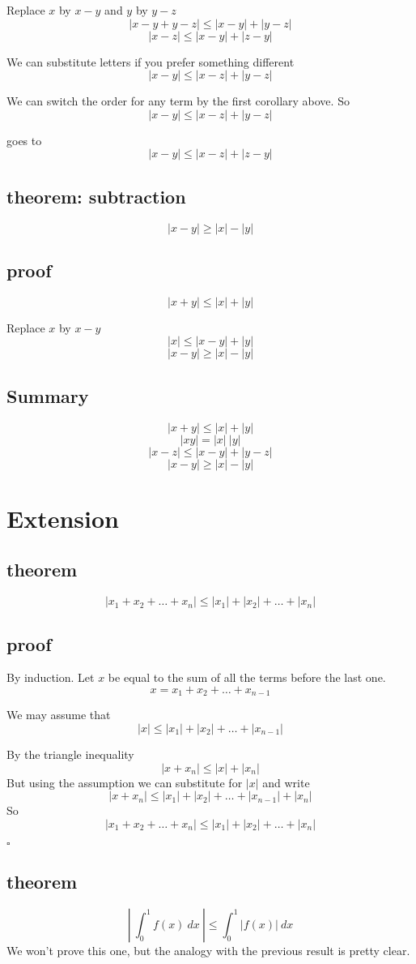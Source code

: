 \documentclass[11pt, oneside]{article}
\begin{document}
Replace $x$ by $x-y$ and $y$ by $y-z$ 
\[ |x-y + y-z| \le |x-y| + |y-z| \]
\[ |x - z|  \le |x - y| + |z - y| \]

We can substitute letters if you prefer something different
\[ |x - y|  \le |x - z| + |y - z| \]

We can switch the order for any term by the first corollary above.  So
\[ |x - y|  \le |x - z| + |y - z| \]

goes to
\[ |x - y|  \le |x - z| + |z - y| \]

\subsection*{theorem:  subtraction}
\[  |x - y| \ge |x| - |y|  \]

\subsection*{proof}
\[ |x + y| \le |x| + |y| \]

Replace $x$ by $x - y$
\[ |x| \le |x - y| + |y| \]
\[ |x - y| \ge |x| - |y| \]

\subsection*{Summary}
\[ |x + y| \le  |x| +  |y| \]
\[ |xy| = |x| \ |y| \]
\[ | x - z | \le | x - y | + | y - z | \]
\[ |x - y| \ge |x| - |y| \]

\section{Extension}

\subsection*{theorem}

\[ |x_1 + x_2 + \dots + x_n| \le |x_1| + |x_2| + \dots + |x_n| \]

\subsection*{proof}

By induction.  Let $x$ be equal to the sum of all the terms before the last one.
\[ x = x_1 + x_2 + \dots + x_{n-1} \]

We may assume that
\[ |x| \le  |x_1| + |x_2| + \dots + |x_{n-1}| \] 

By the triangle inequality
\[ |x + x_n| \le |x| + |x_n| \]
But using the assumption we can substitute for $|x|$ and write
\[ |x + x_n| \le |x_1| + |x_2| + \dots + |x_{n-1}| + |x_n| \]
So
\[ |x_1 + x_2 + \dots + x_n| \le |x_1| + |x_2| + \dots + |x_n| \]

$\square$

\subsection*{theorem}
\[ | \ \int_0^1 f(x) \ dx \ | \le \int_0^1 |f(x)| \ dx \]
We won't prove this one, but the analogy with the previous result is pretty clear.
\end{document}
